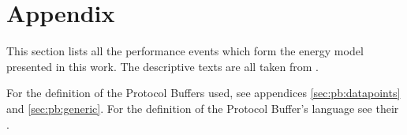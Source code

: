 \appendix
\appendixpage
\addappheadtotoc

\renewcommand\thesection{\Alph{section}}
\chapter{Appendix}

\label{appendix:chosen-events}

This section lists all the performance events which form the energy model
presented in this work. The descriptive texts are all taken from
\cite{intel2011events}.





\label{sec:fmt:datapoints}
For the definition of the Protocol Buffers used, see appendices
\ref{sec:pb:datapoints} and \ref{sec:pb:generic}. For the definition of the
Protocol Buffer's language see their
.



\label{sec:pb:generic}


\label{sec:pb:datapoints}


\label{sec:pb:counter-files}

